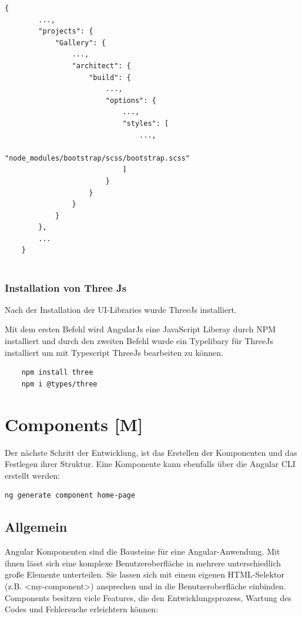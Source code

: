 \begin{lstlisting}[caption={{angular.json - Bootstrap Angular Verknüpfung}},label=lst:impl:BootstraptConfig]
    {
        ...,
        "projects": {
            "Gallery": {
                ...,
                "architect": {
                    "build": {
                        ...,
                        "options": {
                            ...,
                            "styles": [
                                ...,
                                "node_modules/bootstrap/scss/bootstrap.scss"
                            ]
                        }
                    }
                }
            }
        },
        ...
    }
    
\end{lstlisting}


\subsubsection{Installation von Three Js}
Nach der Installation der UI-Libraries wurde ThreeJs installiert. 

Mit dem ersten Befehl wird AngularJs eine JavaScript Liberay durch NPM installiert und durch den zweiten Befehl wurde ein Typelibary für ThreeJs installiert um mit Typescript ThreeJs bearbeiten zu können.
\begin{lstlisting}
    npm install three
    npm i @types/three
\end{lstlisting}

\section{Components [M]}
Der nächste Schritt der Entwicklung, ist das Erstellen der Komponenten und das Festlegen ihrer Struktur. Eine Komponente kann ebenfalls über die Angular CLI erstellt werden:

\begin{lstlisting}[caption={{Terminal - Component erstellen}},language=bash,label=lst:impl:addComponent]
    ng generate component home-page
\end{lstlisting}

\subsection{Allgemein}
Angular Komponenten sind die Bausteine für eine Angular-Anwendung. Mit ihnen lässt sich eine komplexe Benutzeroberfläche in mehrere unterschiedlich große Elemente unterteilen. Sie lassen sich mit einem eigenen HTML-Selektor (z.B. <my-component>) ansprechen und in die Benutzeroberfläche einbinden. Components besitzen viele Features, die den Entwicklungsprozess, Wartung des Codes und Fehlersuche erleichtern können:

